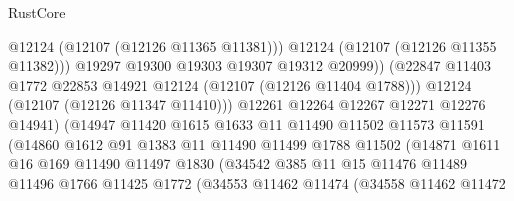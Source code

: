 \begin{lexlean}{RustCore}
\begin{coremodule}
                                      @12124
                                      (@12107 (@12126 @11365 @11381)))
                                    @12124
                                    (@12107 (@12126 @11355 @11382)))
                                  @19297
                                  @19300
                                  @19303
                                  @19307
                                  @19312
                                  @20999))
                              (@22847
                                @11403
                                @1772
                                @22853
                                @14921
                                @12124
                                (@12107 (@12126 @11404 @1788)))
                              @12124
                              (@12107 (@12126 @11347 @11410)))
                            @12261
                            @12264
                            @12267
                            @12271
                            @12276
                            @14941)
                          (@14947
                            @11420
                            @1615
                            @1633
                            @11
                            @11490
                            @11502
                            @11573
                            @11591
                            (@14860
                              @1612
                              @91
                              @1383
                              @11
                              @11490
                              @11499
                              @1788
                              @11502
                              (@14871
                                @1611
                                @16
                                @169
                                @11490
                                @11497
                                @1830
                                (@34542
                                  @385
                                  @11
                                  @15
                                  @11476
                                  @11489
                                  @11496
                                  @1766
                                  @11425
                                  @1772
                                  (@34553
                                    @11462
                                    @11474
                                    (@34558
                                      @11462
                                      @11472

\end{coremodule}
\end{lexlean}
